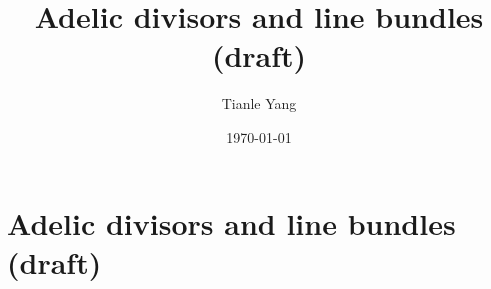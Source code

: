 \documentclass{noteformyself}
\title{Adelic divisors and line bundles (draft)}
\author{Tianle Yang}
\date{\today}
\begin{document}
    \maketitle

    \section{Adelic divisors and line bundles (draft)}

    

\end{document}
